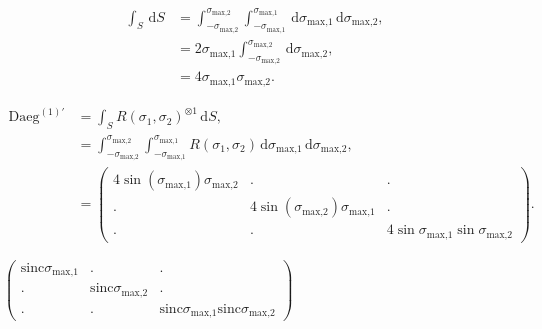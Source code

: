 \documentclass[a4paper,11pt,twoside,openright]{book}
\providecommand{\sinc}{{\mathrm{sinc}}}%
\def\lthtmlcheckvsize{\ifdim\ht\sizebox<\vsize 
  \ifdim\wd\sizebox<\hsize\expandafter\hfill\fi \expandafter\vfill
  \else\expandafter\vss\fi}%
\begin{document}
{\newpage\clearpage
\setcounter{equation}{69}
%
\begin{subequations}\begin{align}
\int_S \,\mathrm{d}S &= \int_{-\sigma_{\textrm{max,2}}}^{\sigma_{\textrm{max,2}}} \int_{-\sigma_{\textrm{max,1}}}^{\sigma_{\textrm{max,1}}} \,\mathrm{d}\sigma_{\textrm{max,1}}\,\mathrm{d}\sigma_{\textrm{max,2}}, \\
&= 2 \sigma_{\textrm{max,1}}\int_{-\sigma_{\textrm{max,2}}}^{\sigma_{\textrm{max,2}}} \,\mathrm{d}\sigma_{\textrm{max,2}}, \\
&= 4 \sigma_{\textrm{max,1}}\sigma_{\textrm{max,2}}.
\end{align}\end{subequations}%
\lthtmldisplayZ
\lthtmlcheckvsize\clearpage}

{\newpage\clearpage
\setcounter{equation}{70}
%
\begin{subequations}\begin{align}
\textrm{Daeg}^{(1)'}&= \int_S R(\sigma_1, \sigma_2)^{\otimes 1} \,\mathrm{d}S, \\
&= \int_{-\sigma_{\textrm{max,2}}}^{\sigma_{\textrm{max,2}}} \int_{-\sigma_{\textrm{max,1}}}^{\sigma_{\textrm{max,1}}} R(\sigma_1, \sigma_2) \,\mathrm{d}\sigma_{\textrm{max,1}}\,\mathrm{d}\sigma_{\textrm{max,2}}, \\
&=
\begin{pmatrix}
4\sin(\sigma_{\textrm{max,1}})\sigma_{\textrm{max,2}}& .                               & . \\
.                               & 4\sin(\sigma_{\textrm{max,2}})\sigma_{\textrm{max,1}}& . \\
.                               & .                               & 4\sin\sigma_{\textrm{max,1}}\sin\sigma_{\textrm{max,2}}
\end{pmatrix}.
\end{align}\end{subequations}%
\lthtmldisplayZ
\lthtmlcheckvsize\clearpage}

{\newpage\clearpage
{}%
$\displaystyle \begin{pmatrix}
\sinc \sigma_{\textrm{max,1}}& .                 & . \\
.                 & \sinc \sigma_{\textrm{max,2}}& . \\
.                 & .                 & \sinc \sigma_{\textrm{max,1}}\sinc \sigma_{\textrm{max,2}}
\end{pmatrix}$%
\lthtmlindisplaymathZ
\lthtmlcheckvsize\clearpage}
\end{document}
